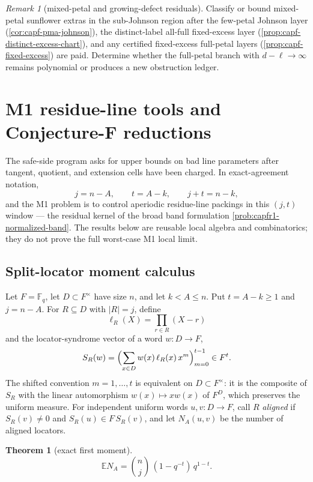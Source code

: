 \documentclass[11pt]{article}
\newtheorem{theorem}{Theorem}[section]
\theoremstyle{definition}
\theoremstyle{remark}
\newtheorem{remark}[remark]{Remark}
\newcommand{\F}{\mathbb{F}}
\providecommand{\E}{\mathbb E}
\begin{document}
\begin{remark}[mixed-petal and growing-defect residuals]\label{prob:capf-l1-residuals}
Classify or bound mixed-petal sunflower extras in the sub-Johnson region after the few-petal Johnson layer \textup{(\cref{cor:capf-pma-johnson})}, the distinct-label all-full fixed-excess layer \textup{(\cref{prop:capf-distinct-excess-chart})}, and any certified fixed-excess full-petal layers \textup{(\cref{prop:capf-fixed-excess})} are paid.  Determine whether the full-petal branch with $d-\ell\to\infty$ remains polynomial or produces a new obstruction ledger.
\end{remark}

\section{M1 residue-line tools and Conjecture-F reductions}\label{sec:capf-m1}

The safe-side program asks for upper bounds on bad line parameters after tangent, quotient, and extension cells have been charged.  In exact-agreement notation,
\[
        j=n-A,
        \qquad
        t=A-k,
        \qquad
        j+t=n-k,
\]
and the M1 problem is to control aperiodic residue-line packings in this $(j,t)$ window --- the residual kernel of the broad band formulation \cref{prob:capfr1-normalized-band}.  The results below are reusable local algebra and combinatorics; they do not prove the full worst-case M1 local limit.

\subsection{Split-locator moment calculus}

Let $F=\F_q$, let $D\subset F^\times$ have size $n$, and let $k<A\le n$.  Put $t=A-k\ge1$ and $j=n-A$.  For $R\subseteq D$ with $|R|=j$, define
\[
        \ell_R(X)=\prod_{r\in R}(X-r)
\]
and the locator-syndrome vector of a word $w:D\to F$,
\[
        S_R(w)=
        \Bigl(\sum_{x\in D}w(x)\,\ell_R(x)\,x^m\Bigr)_{m=0}^{t-1}
        \in F^t .
\]
The shifted convention $m=1,\ldots,t$ is equivalent on $D\subset F^\times$: it is the composite of $S_R$ with the linear automorphism $w(x)\mapsto xw(x)$ of $F^D$, which preserves the uniform measure.  For independent uniform words $u,v:D\to F$, call $R$ \emph{aligned} if $S_R(v)\ne0$ and $S_R(u)\in F\,S_R(v)$, and let $N_A(u,v)$ be the number of aligned locators.

\begin{theorem}[exact first moment]\label{thm:capf-first-moment}
\[
        \E N_A
        =
        \binom{n}{j}\,(1-q^{-t})\,q^{1-t}.
\]
\end{theorem}
\end{document}
